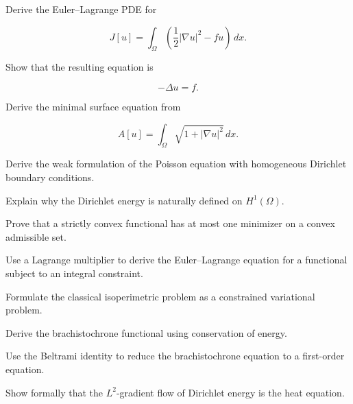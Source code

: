 \begin{exercise}[2]
Derive the Euler--Lagrange PDE for

\[
J[u]
=
\int_\Omega
\left(
\frac12|\nabla u|^2-fu
\right)\,dx.
\]
\end{exercise}

\begin{exercise}[2]
Show that the resulting equation is

\[
-\Delta u=f.
\]
\end{exercise}

\begin{exercise}[3]
Derive the minimal surface equation from

\[
A[u]
=
\int_\Omega
\sqrt{1+|\nabla u|^2}\,dx.
\]
\end{exercise}

\begin{exercise}[3]
Derive the weak formulation of the Poisson equation with homogeneous
Dirichlet boundary conditions.
\end{exercise}

\begin{exercise}[3]
Explain why the Dirichlet energy is naturally defined on \(H^1(\Omega)\).
\end{exercise}

\begin{exercise}[3]
Prove that a strictly convex functional has at most one minimizer on a
convex admissible set.
\end{exercise}

\begin{exercise}[3]
Use a Lagrange multiplier to derive the Euler--Lagrange equation for a
functional subject to an integral constraint.
\end{exercise}

\begin{exercise}[3]
Formulate the classical isoperimetric problem as a constrained
variational problem.
\end{exercise}

\begin{exercise}[3]
Derive the brachistochrone functional using conservation of energy.
\end{exercise}

\begin{exercise}[3]
Use the Beltrami identity to reduce the brachistochrone equation to a
first-order equation.
\end{exercise}

\begin{exercise}[3]
Show formally that the \(L^2\)-gradient flow of Dirichlet energy is the
heat equation.
\end{exercise}


